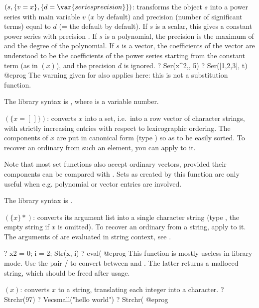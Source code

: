 $(s,\{v=x\},\{d=\var{seriesprecision}\})$: \label{se:Ser}transforms the object $s$ into a power series with main variable $v$
($x$ by default) and precision (number of significant terms) equal to
$d$ (= the default  by default). If $s$ is a
scalar, this gives a constant power series with precision . If $s$
is a polynomial, the precision is the maximum of  and the degree of
the polynomial. If $s$ is a vector, the
coefficients of the vector are understood to be the coefficients of the power
series starting from the constant term (as in $(x)$), and the
precision $d$ is ignored.
\bprog
? Ser(x^2,, 5)
? Ser([1,2,3], t)
@eprog\noindent
The warning given for  also applies here: this is not a substitution
function.

The library syntax is , where  is a variable number.

$(\{x=[\,]\})$: \label{se:Set}
converts $x$ into a set, i.e.~into a row
vector of character strings, with strictly increasing entries with respect to
lexicographic ordering. The components of $x$ are put in canonical form (type
) so as to be easily sorted. To recover an ordinary  from
such an element, you can apply  to it.

Note that most set functions also accept ordinary vectors, provided their
components can be compared with \kbd{<}. Sets as created by this function
are only useful when e.g. polynomial or vector entries are involved.

The library syntax is .

$(\{x\}*)$: \label{se:Str}
converts its argument list into a
single character string (type , the empty string if $x$ is omitted).
To recover an ordinary  from a string, apply  to it. The
arguments of  are evaluated in string context, see .

\bprog
? x2 = 0; i = 2; Str(x, i)
? eval(%
@eprog\noindent
This function is mostly useless in library mode. Use the pair
/ to convert between  and .
The latter returns a malloced string, which should be freed after usage.

$(x)$: \label{se:Strchr}
converts $x$ to a string, translating each integer
into a character.
\bprog
? Strchr(97)
? Vecsmall("hello world")
? Strchr(%
@eprog

